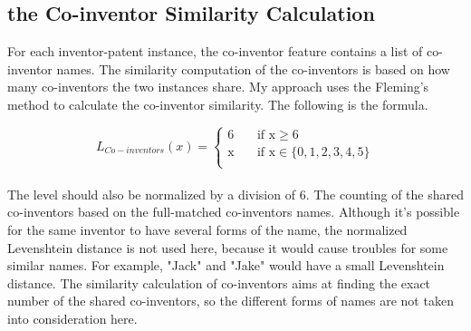 \subsection{the Co-inventor Similarity Calculation}
For each inventor-patent instance, the co-inventor feature contains a list of co-inventor names. The similarity computation of the co-inventors is based on how many co-inventors the two instances share. My approach uses the Fleming's method to calculate the co-inventor similarity. The following is the formula.

\[   
L_{Co-inventors}(x) = 
     \begin{cases}
       \text{6} &\quad\text{if x}\ge6\\
       \text{x} &\quad\text{if x} \in \{0,1,2,3,4,5\} \\
     \end{cases}
\]
\\

The level should also be normalized by a division of 6. The counting of the shared co-inventors based on the full-matched co-inventors names. Although it's possible for the same inventor to have several forms of the name, the normalized Levenshtein distance is not used here, because it would cause troubles for some similar names. For example, "Jack" and "Jake" would have a small Levenshtein distance. The similarity calculation of co-inventors aims at finding the exact number of the shared co-inventors,  so the different forms of names are not taken into consideration here.

